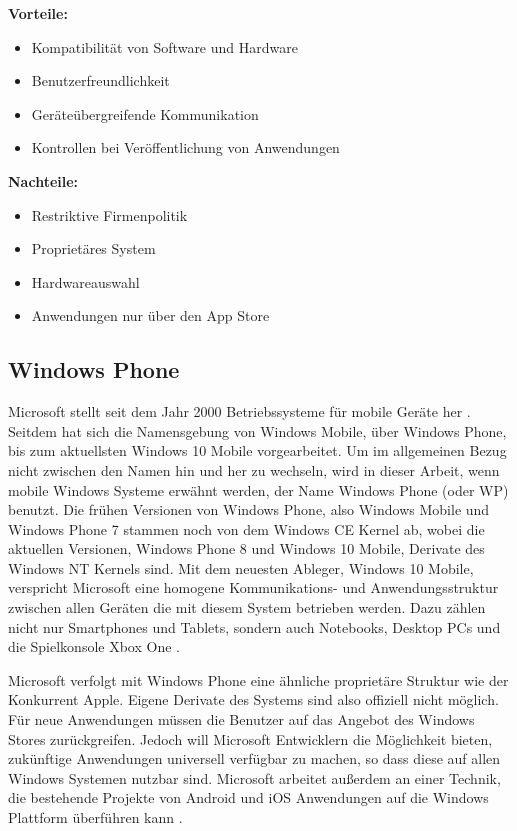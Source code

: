 \textbf{Vorteile:}
\begin{itemize}
	\item Kompatibilität von Software und Hardware
	\item Benutzerfreundlichkeit
	\item Geräteübergreifende Kommunikation
	\item Kontrollen bei Veröffentlichung von Anwendungen
\end{itemize}

\textbf{Nachteile:}
\begin{itemize}
	\item Restriktive Firmenpolitik
	\item Proprietäres System
	\item Hardwareauswahl
	\item Anwendungen nur über den App Store
\end{itemize}

\subsection{Windows Phone}
Microsoft stellt seit dem Jahr 2000 Betriebssysteme für mobile Geräte her \citep{microsoft_mobile}. Seitdem hat sich die Namensgebung von Windows Mobile, über Windows Phone, bis zum aktuellsten Windows 10 Mobile vorgearbeitet. Um im allgemeinen Bezug nicht zwischen den Namen hin und her zu wechseln, wird in dieser Arbeit, wenn mobile Windows Systeme erwähnt werden, der Name Windows Phone (oder WP) benutzt.
Die frühen Versionen von Windows Phone, also Windows Mobile und Windows Phone 7 stammen noch von dem Windows CE Kernel ab, wobei die aktuellen Versionen, Windows Phone 8 und Windows 10 Mobile, Derivate des Windows NT Kernels sind. Mit dem neuesten Ableger, Windows 10 Mobile, verspricht Microsoft eine homogene Kommunikations- und Anwendungsstruktur zwischen allen Geräten die mit diesem System betrieben werden. Dazu zählen nicht nur Smartphones und Tablets, sondern auch Notebooks, Desktop PCs und die Spielkonsole Xbox One \citep{windows10_features}.

Microsoft verfolgt mit Windows Phone eine ähnliche proprietäre Struktur wie der Konkurrent Apple. Eigene Derivate des Systems sind also offiziell nicht möglich. Für neue Anwendungen müssen die Benutzer auf das Angebot des Windows Stores zurückgreifen. Jedoch will Microsoft Entwicklern die Möglichkeit bieten, zukünftige Anwendungen universell verfügbar zu machen, so dass diese auf allen Windows Systemen nutzbar sind. Microsoft arbeitet außerdem an einer Technik, die bestehende Projekte von Android und iOS Anwendungen auf die Windows Plattform überführen kann \citep{wp_with_android_ios}.

